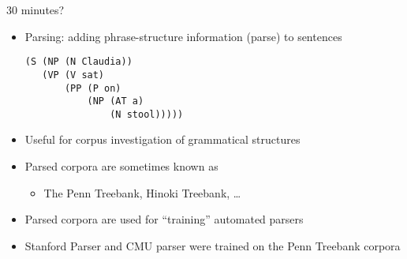 \documentclass[a4paper,landscape,headrule,footrule,xetex]{foils}
\begin{document}
30 minutes?

\begin{itemize}\addtolength{\itemsep}{-1.5ex}
\item  Parsing: adding phrase-structure information (parse) to sentences
\begin{verbatim}
(S (NP (N Claudia))
   (VP (V sat)
       (PP (P on)
           (NP (AT a)
               (N stool)))))
\end{verbatim}

\item  Useful for corpus investigation of grammatical structures
\item  Parsed corpora are sometimes known as 
  \begin{itemize}
  \item The Penn Treebank, Hinoki Treebank, \ldots
  \end{itemize}
\item  Parsed corpora are used for ``training'' automated parsers
\item  Stanford Parser and CMU parser were trained on the Penn Treebank corpora
\end{itemize}
\end{document}
